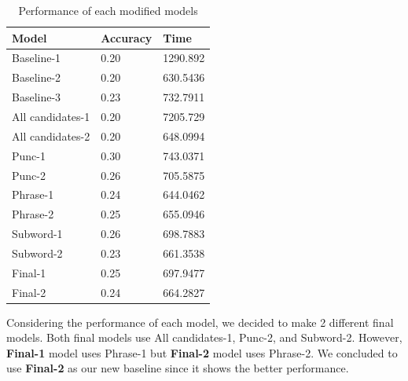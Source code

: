 \documentclass[11pt,a4paper]{article}
\begin{document}
\begin{table}[hbt!]
\begin{tabularx}{\columnwidth}{X|l|l}
\hline
\textbf{Model}   & \textbf{Accuracy} & \textbf{Time}     \\ \hline
Baseline-1       & 0.20     & 1290.892 \\ %
Baseline-2       & 0.20     & 630.5436  \\ %
Baseline-3       & 0.23     & 732.7911  \\ %
All candidates-1 & 0.20     & 7205.729 \\ %
All candidates-2 & 0.20     & 648.0994  \\ %
Punc-1           & 0.30     & 743.0371  \\ %
Punc-2           & 0.26     & 705.5875  \\ %
Phrase-1         & 0.24     & 644.0462  \\ %
Phrase-2         & 0.25     & 655.0946  \\ %
Subword-1        & 0.26     & 698.7883  \\ %
Subword-2        & 0.23     & 661.3538  \\ %
Final-1          & 0.25     & 697.9477  \\ %
Final-2          & 0.24     & 664.2827  \\ \hline
\end{tabularx}
\caption{Performance of each modified models}
\label{tab:result_modification}
\end{table}

Considering the performance of each model, we decided to make 2 different final models. 
Both final models use All candidates-1, Punc-2, and Subword-2.
However, \textbf{Final-1} model uses Phrase-1 but \textbf{Final-2} model uses Phrase-2.
We concluded to use \textbf{Final-2} as our new baseline since it shows the better performance.
\end{document}
